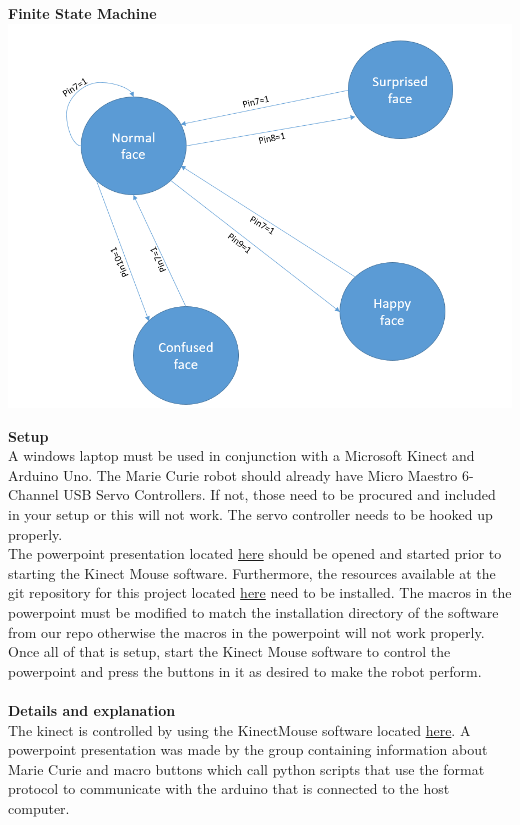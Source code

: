 \documentclass[12pt]{article}
\begin{document}
\begin{description}
		\textbf{Finite State Machine}
		\includegraphics{FSM.png}
		
		\textbf{Setup} \hfill \\
		A windows laptop must be used in conjunction with a Microsoft Kinect and Arduino Uno. The Marie Curie robot should already have Micro Maestro 6-Channel USB Servo Controllers. If not, those need to be procured and included in your setup or this will not work. The servo controller needs to be hooked up properly. \\
		The powerpoint presentation located \href{http://linktopowerpoint}{here} should be opened and started prior to starting the Kinect Mouse software. Furthermore, the resources available at the git repository for this project located \href{https://github.com/wrh2/ECE478}{here} need to be installed. The macros in the powerpoint must be modified to match the installation directory of the software from our repo otherwise the macros in the powerpoint will not work properly. \\
		Once all of that is setup, start the Kinect Mouse software to control the powerpoint and press the buttons in it as desired to make the robot perform.\\ \\
		\textbf{Details and explanation} \hfill \\
		The kinect is controlled by using the KinectMouse software located \href{http://futuretechblog.com/?p=26}{here}. A powerpoint presentation was made by the group containing information about Marie Curie and macro buttons which call python scripts that use the format protocol to communicate with the arduino that is connected to the host computer.
		

\end{description}
\end{document}
